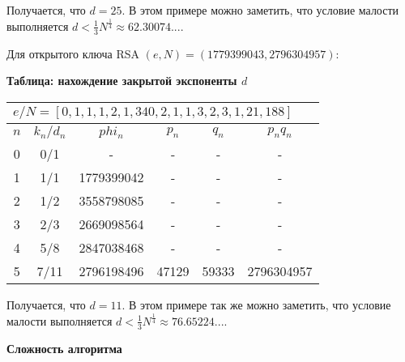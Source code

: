 \documentclass[12pt,a4paper]{scrartcl}
\begin{document}
Получается, что $d=25$. В этом примере можно заметить, что условие малости выполняется $d<{\frac {1}{3}}N^{\frac {1}{4}}\approx 62.30074...$.

Для открытого ключа RSA $(e,N)=(1779399043,2796304957)$:

\textbf{Таблица: нахождение закрытой экспоненты $d$} 
\begin{table}[H]
	\centering
	\begin{tabular}{|c|c|c|c|c|c|}
		\hline
		\multicolumn{6}{|l|}{$e/N = [0, 1, 1, 1, 2, 1, 340, 2, 1, 1, 3, 2, 3, 1, 21, 188]$}                                                                                 \\ \hline
		\textit{\textbf{$n$}} & \textit{\textbf{$k_n / d_n$}} & \textit{\textbf{$phi_n$}} & \textit{\textbf{$p_n$}} & \textit{\textbf{$q_n$}} & \textit{\textbf{$p_n q_n$}} \\ \hline
		0                     & 0/1                           & -                         & -                       & -                       & -                           \\ \hline
		1                     & 1/1                           & 1779399042                & -                       & -                       & -                           \\ \hline
		2                     & 1/2                           & 3558798085                & -                       & -                       & -                           \\ \hline
		3                     & 2/3                           & 2669098564                & -                       & -                       & -                           \\ \hline
		4                     & 5/8                           & 2847038468                & -                       & -                       & -                           \\ \hline
		5                     & 7/11                          & 2796198496                & 47129                   & 59333                   & 2796304957                  \\ \hline
	\end{tabular}
\end{table}

Получается, что $d=11$. В этом примере так же можно заметить, что условие малости выполняется $d<{\frac {1}{3}}N^{\frac {1}{4}}\approx 76.65224...$.

\textbf{Сложность алгоритма}
\end{document}
